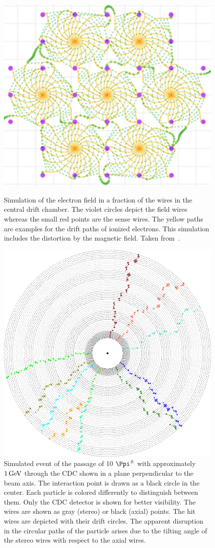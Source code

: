\begin{figure}
  \caption[Simulation of the electron field in the central drift chamber.]{Simulation of the electron field in a fraction of the wires in the central drift chamber. The violet circles depict the field wires whereas the small red points are the sense wires. The yellow paths are examples for the drift paths of ionized electrons. This simulation includes the distortion by the magnetic field. Taken from~\cite{cdc_design}.}
  \includegraphics[width=0.5\linewidth]{figures/experimental_setup/electronsInCDC.pdf}
  \label{fig-sense-wires}
\end{figure}

\begin{figure}
  \centering
  \includegraphics[width=0.8\linewidth]{figures/experimental_setup/eventDisplayPionGun.png}
  \caption[Simulated event of the passage of 10 $\Ppi^\pm$ through the CDC.]{Simulated event of the passage of 10 $\Ppi^\pm$ with approximately $\unit[1]{GeV}$ through the CDC shown in a plane perpendicular to the beam axis. The interaction point is drawn as a black circle in the center. Each particle is colored differently to distinguish between them. Only the CDC detector is shown for better visibility. The wires are shown as gray (stereo) or black (axial) points. The hit wires are depicted with their drift circles. The apparent disruption in the circular paths of the particle arises due to the tilting angle of the stereo wires with respect to the axial wires.}
  \label{fig-event-display}
\end{figure}

